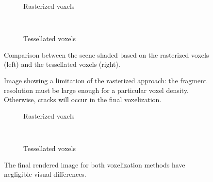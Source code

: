 \begin{figure}
\begin{subfigure}[t]{0.475\textwidth}
    \caption{Rasterized voxels}
\end{subfigure}
~
\begin{subfigure}[t]{0.475\textwidth}
    \caption{Tessellated voxels}
\end{subfigure}
\caption{Comparison between the scene shaded based on the rasterized voxels (left) and the tessellated voxels (right).}
\label{fig:voxelcomparison}
\end{figure}

\begin{figure}
\centering
\begin{subfigure}[t]{0.475\textwidth}
\end{subfigure}
\caption{Image showing a limitation of the rasterized approach: the fragment resolution must be large enough for a particular voxel density. Otherwise, cracks will occur in the final voxelization.}
\label{fig:voxellimitations}
\end{figure}

\begin{figure}[h!]
\centering
    \begin{subfigure}[t]{0.475\textwidth}
        \caption{Rasterized voxels}
    \end{subfigure}
    ~
    \begin{subfigure}[t]{0.475\textwidth}
        \caption{Tessellated voxels}
    \end{subfigure}
    \caption{The final rendered image for both voxelization methods have negligible visual differences.}
    \label{fig:results_voxelization}
\end{figure}

